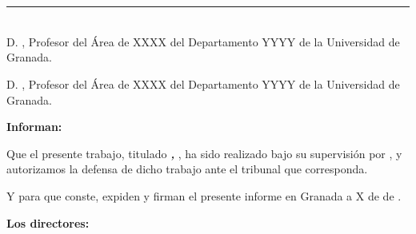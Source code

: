 \chapter*{}
\thispagestyle{empty}

\noindent\rule[-1ex]{\textwidth}{2pt}\\[4.5ex]

D. \textbf{\tfgtutornameA}, Profesor del Área de XXXX del Departamento YYYY de la Universidad de Granada.

\vspace{0.5cm}

D. \textbf{\tfgtutornameB}, Profesor del Área de XXXX del Departamento YYYY de la Universidad de Granada.


\vspace{0.5cm}

\textbf{Informan:}

\vspace{0.5cm}

Que el presente trabajo, titulado \textit{\textbf{\tfgtitlename, \tfgsubtitlename}},
ha sido realizado bajo su supervisión por \textbf{\tfgauthorname}, y autorizamos la defensa de dicho trabajo ante el tribunal
que corresponda.

\vspace{0.5cm}

Y para que conste, expiden y firman el presente informe en Granada a X de \tfgmes{} de \tfganno.

\vspace{1cm}

\textbf{Los directores:}

\vspace{4.5cm}

\noindent \textbf{\tfgtutornameA \ \ \ \ \ \tfgtutornameB}